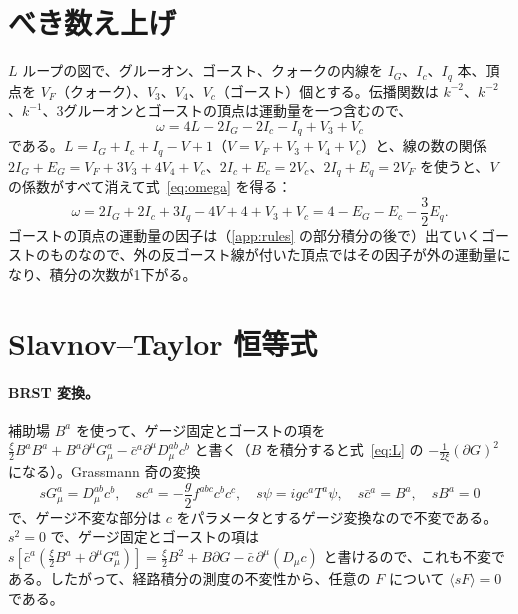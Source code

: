 \documentclass[a4paper,10pt]{ltjsarticle}
\begin{document}
\section{べき数え上げ}\label{app:counting}

$L$ ループの図で、グルーオン、ゴースト、クォークの内線を $I_G$、$I_c$、$I_q$ 本、頂点を $V_F$（クォーク）、$V_3$、$V_4$、$V_c$（ゴースト）個とする。伝播関数は $k^{-2}$、$k^{-2}$、$k^{-1}$、3グルーオンとゴーストの頂点は運動量を一つ含むので、
\begin{equation*}
\omega=4L-2I_G-2I_c-I_q+V_3+V_c
\end{equation*}
である。$L=I_G+I_c+I_q-V+1$（$V=V_F+V_3+V_4+V_c$）と、線の数の関係 $2I_G+E_G=V_F+3V_3+4V_4+V_c$、$2I_c+E_c=2V_c$、$2I_q+E_q=2V_F$ を使うと、$V$ の係数がすべて消えて式~\eqref{eq:omega} を得る：
\begin{equation*}
\omega=2I_G+2I_c+3I_q-4V+4+V_3+V_c=4-E_G-E_c-\frac32E_q.
\end{equation*}
ゴーストの頂点の運動量の因子は（\ref{app:rules} の部分積分の後で）出ていくゴーストのものなので、外の反ゴースト線が付いた頂点ではその因子が外の運動量になり、積分の次数が1下がる。

\section{Slavnov--Taylor 恒等式}\label{app:st}

\paragraph{BRST 変換。}補助場 $B^a$ を使って、ゲージ固定とゴーストの項を $\frac\xi2B^aB^a+B^a\partial^\mu G^a_\mu-\bar c^a\partial^\mu D_\mu^{ab}c^b$ と書く（$B$ を積分すると式~\eqref{eq:L} の $-\frac1{2\xi}(\partial G)^2$ になる）。Grassmann 奇の変換
\begin{equation*}
sG^a_\mu=D_\mu^{ab}c^b,\quad sc^a=-\frac g2f^{abc}c^bc^c,\quad s\psi=igc^aT^a\psi,\quad s\bar c^a=B^a,\quad sB^a=0
\end{equation*}
で、ゲージ不変な部分は $c$ をパラメータとするゲージ変換なので不変である。$s^2=0$ で、ゲージ固定とゴーストの項は $s[\bar c^a(\frac\xi2B^a+\partial^\mu G^a_\mu)]=\frac\xi2B^2+B\partial G-\bar c\,\partial^\mu(D_\mu c)$ と書けるので、これも不変である。したがって、経路積分の測度の不変性から、任意の $F$ について $\langle sF\rangle=0$ である。
\end{document}
